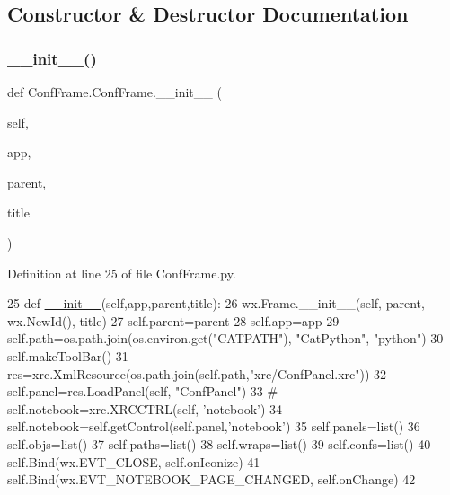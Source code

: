 \subsection{Constructor \& Destructor Documentation}
\mbox{\label{classConfFrame_1_1ConfFrame_addff8c48a5ddb190fed5105a4f70ca95}} 
\subsubsection{\texorpdfstring{\+\_\+\+\_\+init\+\_\+\+\_\+()}{\_\_init\_\_()}}
{\footnotesize\ttfamily def Conf\+Frame.\+Conf\+Frame.\+\_\+\+\_\+init\+\_\+\+\_\+ (\begin{DoxyParamCaption}\item[{}]{self,  }\item[{}]{app,  }\item[{}]{parent,  }\item[{}]{title }\end{DoxyParamCaption})}



Definition at line 25 of file Conf\+Frame.\+py.


\begin{DoxyCode}
25     \textcolor{keyword}{def }\hyperlink{classwrapper_1_1ModuleDictWrapper_a9a7a794150502f51df687831583e13b9}{\_\_init\_\_}(self,app,parent,title): 
26         wx.Frame.\_\_init\_\_(self, parent, wx.NewId(), title)
27         self.parent=parent
28         self.app=app
29         self.path=os.path.join(os.environ.get(\textcolor{stringliteral}{"CATPATH"}), \textcolor{stringliteral}{"CatPython"}, \textcolor{stringliteral}{"python"})
30         self.makeToolBar()
31         res=xrc.XmlResource(os.path.join(self.path,\textcolor{stringliteral}{"xrc/ConfPanel.xrc"}))
32         self.panel=res.LoadPanel(self, \textcolor{stringliteral}{"ConfPanel"})
33 \textcolor{comment}{#        self.notebook=xrc.XRCCTRL(self, 'notebook')}
34         self.notebook=self.getControl(self.panel,\textcolor{stringliteral}{'notebook'})
35         self.panels=list()
36         self.objs=list()
37         self.paths=list()
38         self.wraps=list()
39         self.confs=list()
40         self.Bind(wx.EVT\_CLOSE, self.onIconize)
41         self.Bind(wx.EVT\_NOTEBOOK\_PAGE\_CHANGED, self.onChange)
42 
\end{DoxyCode}


